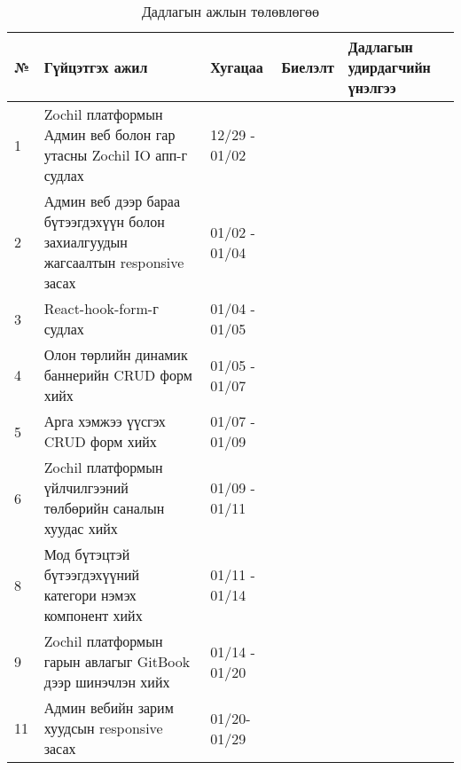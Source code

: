 \begin{table}[h]
	\caption{Дадлагын ажлын төлөвлөгөө}
	\begin{tabular}{|p{0.5cm}|p{8cm}|l|l|p{3cm}|}
	\hline
	\textbf{№} & \textbf{Гүйцэтгэх ажил} & \textbf{Хугацаа} & \textbf{Биелэлт} & \textbf{Дадлагын удирдагчийн үнэлгээ} \\ \hline
	1 & Zochil платформын Админ веб болон гар утасны Zochil IO апп-г судлах & 12/29 - 01/02 && \\ \hline
	2 & Админ веб дээр бараа бүтээгдэхүүн болон захиалгуудын жагсаалтын responsive засах & 01/02 - 01/04 && \\ \hline
	3 & React-hook-form-г судлах & 01/04 - 01/05 && \\ \hline
	4 &  Олон төрлийн динамик баннерийн CRUD форм хийх  & 01/05 - 01/07 && \\ \hline
	5 &  Арга хэмжээ үүсгэх CRUD форм хийх & 01/07 - 01/09 && \\ \hline
	6 & Zochil платформын үйлчилгээний төлбөрийн саналын хуудас хийх & 01/09 - 01/11 && \\ \hline
	8 & Мод бүтэцтэй бүтээгдэхүүний категори нэмэх компонент хийх  & 01/11 - 01/14 && \\ \hline
   9 & Zochil платформын гарын авлагыг GitBook дээр шинэчлэн хийх  & 01/14 - 01/20 && \\ \hline
   11 & Админ вебийн зарим хуудсын responsive засах & 01/20- 01/29 && \\ \hline

	\end{tabular}
\end{table}